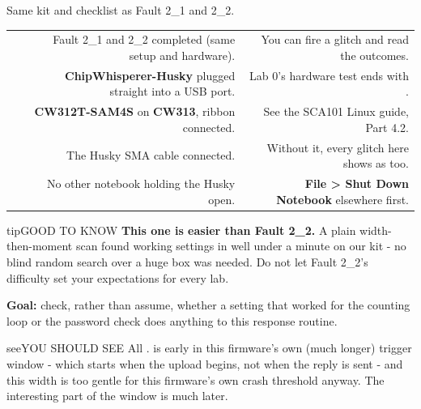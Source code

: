 \documentclass[11pt,letterpaper]{article}
\begin{document}
\clearpage


Same kit and checklist as Fault 2\_1 and 2\_2.

{\small{}
\begin{longtable}{|R{0.0652}|R{0.4783}|R{0.4565}|}
\hline
{}\hdrcell{} &  &  \\ \hline
\endhead
[  ] & Fault 2\_1 and 2\_2 completed (same setup and hardware). & You can fire a glitch and read the outcomes. \\ \hline
[  ] & \textbf{ChipWhisperer-Husky} plugged straight into a USB port. & Lab 0's hardware test ends with . \\ \hline
[  ] & \textbf{CW312T-SAM4S} on \textbf{CW313}, ribbon connected. & See the SCA101 Linux guide, Part 4.2. \\ \hline
[  ] & The Husky \textbf{} SMA cable connected. & Without it, every glitch here shows as  too. \\ \hline
[  ] & No other notebook holding the Husky open. & \textbf{File \textgreater{} Shut Down Notebook} elsewhere first. \\ \hline
\end{longtable}}

\vspace{4pt}

\begin{guidecallout}{tip}{GOOD TO KNOW}
\textbf{This one is easier than Fault 2\_2.} A plain width-then-moment scan found working settings in well under a
minute on our kit - no blind random search over a huge box was needed. Do not let Fault 2\_2's difficulty set your
expectations for every lab.
\end{guidecallout}


\textbf{Goal:} check, rather than assume, whether a setting that worked for the counting loop or the password check
does anything to this response routine.

\begin{guidecallout}{see}{YOU SHOULD SEE}
All .  is early in this firmware's own (much longer) trigger window - which starts
when the upload begins, not when the reply is sent - and this width is too gentle for this firmware's own crash
threshold anyway. The interesting part of the window is much later.
\end{guidecallout}
\end{document}
